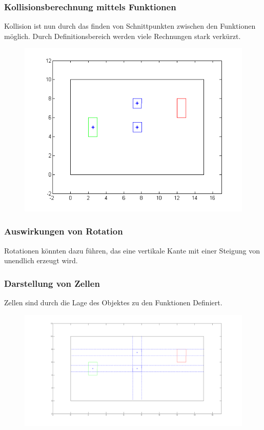 \documentclass[final]{beamer}
\begin{document}
\begin{frame}
\frametitle{Kollisionsberechnung mittels Funktionen}
Kollision ist nun durch das finden von Schnittpunkten zwischen den Funktionen möglich.
Durch Definitionsbereich werden viele Rechnungen stark verkürzt.
\begin{figure}
\centering
\includegraphics[scale=0.3]{../thesis/riddle2}
\end{figure}
\end{frame}

\begin{frame}
\frametitle{Auswirkungen von Rotation}
Rotationen könnten dazu führen, das eine vertikale Kante mit einer Steigung von unendlich erzeugt wird.
\end{frame}

\begin{frame}
\frametitle{Darstellung von Zellen}
Zellen sind durch die Lage des Objektes zu den Funktionen Definiert.
\begin{figure}
\centering
\includegraphics[scale=0.2]{../thesis/riddle2FuncCell}
\end{figure}
\end{frame}
\end{document}
